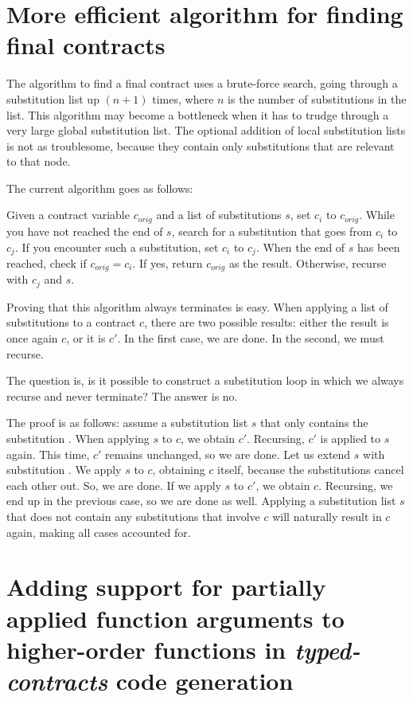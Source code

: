 \documentclass[10pt]{report}
\newcommand{\code}[1]{%
  {%
   \setlength{\fboxsep}{-2\fboxrule}%
   \fcolorbox{black}{light-gray}{\hspace{1.5pt}\strut\texttt{#1}\hspace{1.5pt}}%
  }%
}
\begin{document}
{\section{More efficient algorithm for finding final contracts}
\label{futurework:efficientsubstalgo}

The algorithm to find a final contract uses a brute-force search, going through a substitution list up $(n+1)$ times, where $n$ is the number of substitutions in the list. 
This algorithm may become a bottleneck when it has to trudge through a very large global substitution list.
The optional addition of local substitution lists is not as troublesome, because they contain only substitutions that are relevant to that node.

The current algorithm goes as follows:

Given a contract variable $c_{orig}$ and a list of substitutions $s$, set $c_i$ to $c_{orig}$.
While you have not reached the end of $s$, search for a substitution that goes from $c_i$ to $c_j$.
If you encounter such a substitution, set $c_i$ to $c_j$.
When the end of $s$ has been reached, check if $c_{orig} = c_i$.
If yes, return $c_{orig}$ as the result.
Otherwise, recurse with $c_j$ and $s$.

Proving that this algorithm always terminates is easy.
When applying a list of substitutions to a contract $c$, there are two possible results: either the result is once again $c$, or it is $c'$.
In the first case, we are done.
In the second, we must recurse.

The question is, is it possible to construct a substitution loop in which we always recurse and never terminate?
The answer is no.

The proof is as follows:
assume a substitution list $s$ that only contains the substitution \code{c $\mapsto$ c$'$}.
When applying $s$ to $c$, we obtain $c'$.
Recursing, $c'$ is applied to $s$ again.
This time, $c'$ remains unchanged, so we are done.
Let us extend $s$ with substitution \code{c$'$ $\mapsto$ c}.
We apply $s$ to $c$, obtaining $c$ itself, because the substitutions cancel each other out.
So, we are done.
If we apply $s$ to $c'$, we obtain $c$.
Recursing, we end up in the previous case, so we are done as well.
Applying a substitution list $s$ that does not contain any substitutions that involve $c$ will naturally result in $c$ again, making all cases accounted for.

\section{Adding support for partially applied function arguments to higher-order functions in \textit{typed-contracts} code generation}

}
\end{document}
